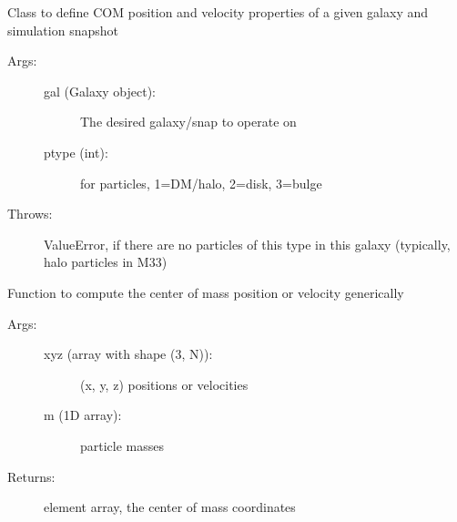 \documentclass[letterpaper,10pt,english]{sphinxmanual}
\begin{document}
\begin{fulllineitems}
\label{\detokenize{centerofmass:galaxy.centerofmass.CenterOfMass}}
Class to define COM position and velocity properties of a given galaxy 
and simulation snapshot
\begin{description}
\item[{Args:}] \leavevmode\begin{description}
\item[{gal (Galaxy object):}] \leavevmode
The desired galaxy/snap to operate on

\item[{ptype (int):}] \leavevmode
for particles, 1=DM/halo, 2=disk, 3=bulge

\end{description}

\item[{Throws:}] \leavevmode
ValueError, if there are no particles of this type in this galaxy
(typically, halo particles in M33)

\end{description}

\begin{fulllineitems}
\label{\detokenize{centerofmass:galaxy.centerofmass.CenterOfMass.com_define}}
Function to compute the center of mass position or velocity generically
\begin{description}
\item[{Args: }] \leavevmode\begin{description}
\item[{xyz (array with shape (3, N)):}] \leavevmode
(x, y, z) positions or velocities

\item[{m (1\sphinxhyphen{}D array):}] \leavevmode
particle masses

\end{description}

\item[{Returns: }] \sphinxhyphen{}element array, the center of mass coordinates

\end{description}


\end{fulllineitems}
\end{fulllineitems}
\end{document}
